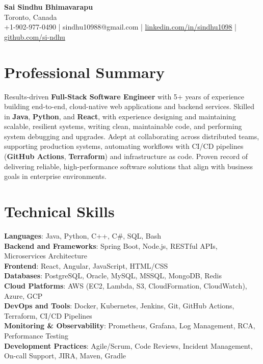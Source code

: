 \documentclass[letterpaper,11pt]{article}
\begin{document}
\begin{center}
  {\Large \textbf{Sai Sindhu Bhimavarapu}} \\
  Toronto, Canada \\
  +1-902-977-0490 \enspace | \enspace sindhu10988@gmail.com \enspace | \enspace \href{https://www.linkedin.com/in/sindhu1098/}{linkedin.com/in/sindhu1098} \enspace | \enspace \href{https://github.com/si-ndhu}{github.com/si-ndhu}
\end{center}

\section{Professional Summary}
  \begin{itemize}[leftmargin=0.15in, label={}]
    \small{\item{
     Results-driven \textbf{Full-Stack Software Engineer} with 5+ years of experience building end-to-end, cloud-native web applications and backend services. Skilled in \textbf{Java}, \textbf{Python}, and \textbf{React}, with experience designing and maintaining scalable, resilient systems, writing clean, maintainable code, and performing system debugging and upgrades. Adept at collaborating across distributed teams, supporting production systems, automating workflows with CI/CD pipelines (\textbf{GitHub Actions}, \textbf{Terraform}) and infrastructure as code. Proven record of delivering reliable, high-performance software solutions that align with business goals in enterprise environments.
    }}
  \end{itemize}
\vspace{-16pt}

\section{Technical Skills}
 \begin{itemize}[leftmargin=0.15in, label={}]
    \small{\item{
     \textbf{Languages}: Java, Python, C++, C\#, SQL, Bash \\
     \textbf{Backend and Frameworks}: Spring Boot, Node.js, RESTful APIs, Microservices Architecture \\
     \textbf{Frontend}: React, Angular, JavaScript, HTML/CSS \\
     \textbf{Databases}: PostgreSQL, Oracle, MySQL, MSSQL, MongoDB, Redis \\
     \textbf{Cloud Platforms}: AWS (EC2, Lambda, S3, CloudFormation, CloudWatch), Azure, GCP \\
     \textbf{DevOps and Tools}: Docker, Kubernetes, Jenkins, Git, GitHub Actions, Terraform, CI/CD Pipelines \\
     \textbf{Monitoring \& Observability}: Prometheus, Grafana, Log Management, RCA, Performance Testing \\
     \textbf{Development Practices}: Agile/Scrum, Code Reviews, Incident Management, On-call Support, JIRA, Maven, Gradle
    }}
 \end{itemize}
\vspace{-16pt}
\end{document}
